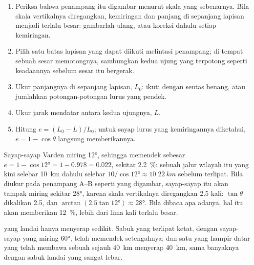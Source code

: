 \begin{method}\label{met:g12:mountain-building:shortening}
\begin{enumerate}
  \item Periksa bahwa penampang itu digambar menurut skala yang sebenarnya.
        Bila skala vertikalnya diregangkan, kemiringan dan panjang di sepanjang
        lapisan menjadi terlalu besar: gambarlah ulang, atau koreksi dahulu
        setiap kemiringan.
  \item Pilih satu batas lapisan yang dapat diikuti melintasi penampang;
        di tempat sebuah sesar memotongnya, sambungkan kedua ujung yang
        terpotong seperti keadaannya sebelum sesar itu bergerak.
  \item Ukur panjangnya di sepanjang lapisan, $L_0$: ikuti dengan seutas
        benang, atau jumlahkan potongan-potongan lurus yang pendek.
  \item Ukur jarak mendatar antara kedua ujungnya, $L$.
  \item Hitung $e = (L_0 - L)/L_0$; untuk sayap lurus yang kemiringannya
        diketahui, $e = 1 - \cos\theta$ langsung memberikannya.
\end{enumerate}
\end{method}

\begin{example}\label{ex:g12:mountain-building:varden}
Sayap-sayap  Varden miring \ang{12}, sehingga  memendek
sebesar $e = 1 - \cos\ang{12} = 1 - 0.978 = 0.022$, sekitar \qty{2.2}{\percent}:
sebuah jalur wilayah itu yang kini selebar \qty{10}{km} dahulu selebar $10/\cos\ang{12} \approx
\qty{10.22}{km}$ sebelum terlipat. Bila diukur pada penampang A--B seperti yang
digambar, sayap-sayap itu akan tampak miring sekitar \ang{28}, karena skala
vertikalnya diregangkan 2.5 kali: $\tan\theta$ dikalikan 2.5, dan $\arctan(2.5
\tan\ang{12}) \approx \ang{28}$. Bila dibaca apa adanya, hal itu akan
memberikan  \qty{12}{\percent}, lebih dari lima kali terlalu besar.
\end{example}

 yang landai hanya menyerap sedikit. Sabuk yang terlipat ketat, dengan
sayap-sayap yang miring \ang{60}, telah memendek setengahnya; dan satu  yang hampir datar yang telah membawa sebuah  sejauh \qty{40}{km}
menyerap  \qty{40}{km}, sama banyaknya dengan sabuk  landai
yang sangat lebar.

